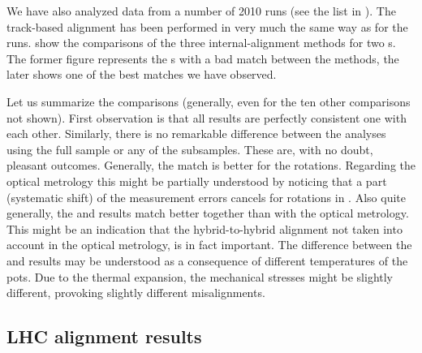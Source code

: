 

We have also analyzed data from a number of 2010  runs (see the list in ). The track-based alignment has been performed in very much the same way as for the  runs.  show the comparisons of the three internal-alignment methods for two s. The former figure represents the s with a bad match between the methods, the later shows one of the best matches we have observed.


Let us summarize the comparisons (generally, even for the ten other comparisons not shown). First observation is that all  results are perfectly consistent one with each other. Similarly, there is no remarkable difference between the  analyses using the full sample or any of the subsamples. These are, with no doubt, pleasant outcomes. Generally, the match is better for the rotations. Regarding the optical metrology this might be partially understood by noticing that a part (systematic shift) of the measurement errors cancels for rotations in . Also quite generally, the  and  results match better together than with the optical metrology. This might be an indication that the hybrid-to-hybrid alignment not taken into account in the optical metrology, is in fact important. The difference between the  and  results may be understood as a consequence of different temperatures of the pots. Due to the thermal expansion, the mechanical stresses might be slightly different, provoking slightly different misalignments.


\subsection[al lhc res]{LHC alignment results}

